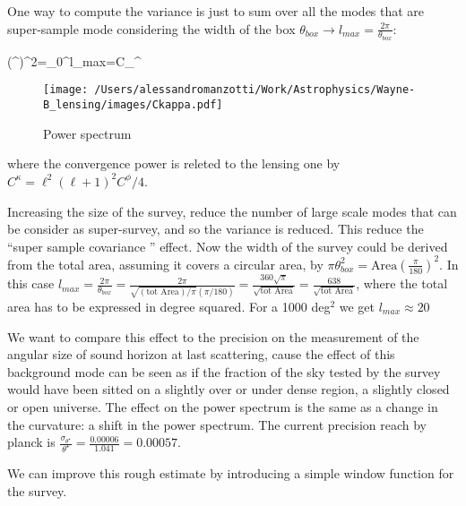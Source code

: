 One way to compute the variance is just to sum over all the modes that are super-sample mode considering the width of the box $\theta_{box}\rightarrow l_{max}=\frac{2\pi}{\theta_{box}}$:

\be \label{eqn:lmax}
(\sigma^{\kappa})^{2}=\sum_{0}^{l_{max}=}C_{\ell}^{\kappa}
\ee

\begin{figure}[htbp]
\begin{center}
\texttt{[image: /Users/alessandromanzotti/Work/Astrophysics/Wayne-B\_lensing/images/Ckappa.pdf]}
\caption{Power spectrum}
\end{center}
\end{figure}

where the convergence power is releted to the lensing one by $C^{\kappa}=\ell^{2}(\ell+1)^{2}C^{\phi}/4$.

Increasing the size of the survey, reduce the number of large scale modes that can be consider as super-survey, and so the variance is reduced. This reduce the ``super sample covariance '' effect. 
Now the width of the survey could be derived from the total area, assuming it covers a circular area, by $\pi \theta_{box}^{2}=\text{Area}(\frac{\pi}{180})^{2}$. 
In this case $l_{max}=\frac{2\pi}{\theta_{box}}=\frac{2\pi}{\sqrt{(\text{tot Area})/\pi} (\pi/180)}=\frac{360\sqrt\pi}{\sqrt{\text{tot Area}}}=\frac{638}{\sqrt{\text{tot Area}}}$, where the total area has to be expressed in degree squared. For a 1000 deg$^{2}$ we get $l_{max}\approx20$

We want to compare this effect to the precision on the measurement of the angular size of sound horizon at last scattering, cause the effect of this background mode can be seen as if the fraction of the sky tested by the survey would have been sitted on a slightly over or under dense region, a slightly closed or open universe. The effect on the power spectrum is the same as a change in the curvature: a shift in the power spectrum.
The current precision reach by planck is $\frac{\sigma_{\theta^{\star}}}{\theta^{\star}}=\frac{0.00006}{1.041}=0.00057$.

We can improve this rough estimate by introducing a simple window function for the survey.

